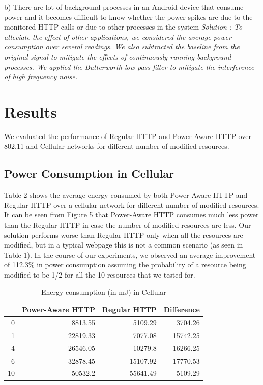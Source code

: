 \documentclass{sigplanconf}
\begin{document}
b) There are lot of background processes in an Android device that consume power and it becomes difficult to know whether the power spikes are due to the monitored HTTP calls or due to other processes in the system\newline
\it{Solution} \rm: To alleviate the effect of other applications, we considered the average power consumption over several readings. We also subtracted the baseline from the original signal to mitigate the effects of continuously running background processes. We applied the Butterworth low-pass filter to mitigate the interference of high frequency noise.

\section{Results}
We evaluated the performance of Regular HTTP and Power-Aware HTTP over 802.11 and Cellular networks for different number of modified resources.  

\subsection{Power Consumption in Cellular}
Table 2 shows the average energy consumed by both Power-Aware HTTP and Regular HTTP over a cellular network for different number of modified resources. It can be seen from Figure 5 that Power-Aware HTTP consumes much less power than the Regular HTTP in case the number of modified resources are less. Our solution performs worse than Regular HTTP only when all the resources are modified, but in a typical webpage this is not a common scenario (as seen in Table 1). In the course of our experiments, we observed an average improvement of 112.3\% in power consumption assuming the probability of a resource being modified to be 1/2 for all the 10 resources that we tested for.

\begin{table}[htbp]
\centering
\caption{Energy consumption (in mJ) in Cellular}
\begin{tabular}{|r|r|r|r|}
\hline
\multicolumn{1}{|l|}{} & \multicolumn{1}{l|}{Power-Aware HTTP} & \multicolumn{1}{l|}{Regular HTTP} & \multicolumn{1}{l|}{Difference} \\ \hline
0 & 8813.55 & 5109.29 & 3704.26 \\ \hline
1 & 22819.33 & 7077.08 & 15742.25 \\ \hline
4 & 26546.05 & 10279.8 & 16266.25 \\ \hline
6 & 32878.45 & 15107.92 & 17770.53 \\ \hline
10 & 50532.2 & 55641.49 & -5109.29 \\ \hline
\end{tabular}
\label{}
\end{table}
\end{document}
